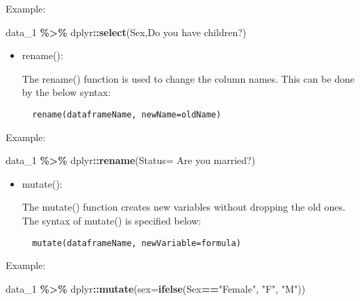 \documentclass[
]{book}
\newenvironment{Shaded}{\begin{snugshade}}{\end{snugshade}}
\newcommand{\AttributeTok}[1]{\textcolor[rgb]{0.13,0.29,0.53}{#1}}
\newcommand{\FunctionTok}[1]{\textcolor[rgb]{0.13,0.29,0.53}{\textbf{#1}}}
\newcommand{\NormalTok}[1]{#1}
\newcommand{\SpecialCharTok}[1]{\textcolor[rgb]{0.81,0.36,0.00}{\textbf{#1}}}
\newcommand{\StringTok}[1]{\textcolor[rgb]{0.31,0.60,0.02}{#1}}
\begin{document}
Example:

\begin{Shaded}
\begin{Highlighting}[]
\NormalTok{data\_1 }\SpecialCharTok{\%\textgreater{}\%} 
\NormalTok{  dplyr}\SpecialCharTok{::}\FunctionTok{select}\NormalTok{(Sex,}\StringTok{\textasciigrave{}}\AttributeTok{Do you  have children?}\StringTok{\textasciigrave{}}\NormalTok{)}
\end{Highlighting}
\end{Shaded}

\begin{itemize}
\item
  rename():

  The rename() function is used to change the column names. This can be done by the below syntax:

\begin{verbatim}
  rename(dataframeName, newName=oldName)
\end{verbatim}
\end{itemize}

Example:

\begin{Shaded}
\begin{Highlighting}[]
\NormalTok{data\_1 }\SpecialCharTok{\%\textgreater{}\%}
\NormalTok{  dplyr}\SpecialCharTok{::}\FunctionTok{rename}\NormalTok{(}\AttributeTok{Status=} \StringTok{\textasciigrave{}}\AttributeTok{Are you married?}\StringTok{\textasciigrave{}}\NormalTok{)}
\end{Highlighting}
\end{Shaded}

\begin{itemize}
\item
  mutate():

  The mutate() function creates new variables without dropping the old ones. The syntax of mutate() is specified below:

\begin{verbatim}
  mutate(dataframeName, newVariable=formula)
\end{verbatim}
\end{itemize}

Example:

\begin{Shaded}
\begin{Highlighting}[]
\NormalTok{data\_1 }\SpecialCharTok{\%\textgreater{}\%}
\NormalTok{  dplyr}\SpecialCharTok{::}\FunctionTok{mutate}\NormalTok{(}\AttributeTok{sex=}\FunctionTok{ifelse}\NormalTok{(Sex}\SpecialCharTok{==}\StringTok{"Female"}\NormalTok{, }\StringTok{"F"}\NormalTok{, }\StringTok{"M"}\NormalTok{))}
\end{Highlighting}
\end{Shaded}
\end{document}
